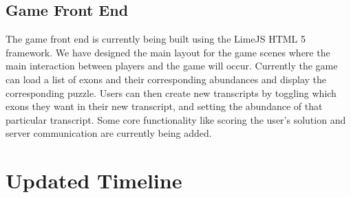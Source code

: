 \documentclass[12pt]{article}
\begin{document}
\subsection*{Game Front End}
The game front end is currently being built using the LimeJS HTML 5 framework. We have designed the main layout for the game scenes where the main interaction between players
and the game will occur. Currently the game can load a list of exons and their corresponding abundances and display the corresponding puzzle. Users can then create new transcripts 
by toggling which exons they want in their new transcript, and setting the abundance of that particular transcript. Some core functionality like scoring the user's solution and 
server communication are currently being added.


\section{Updated Timeline}
\end{document}
